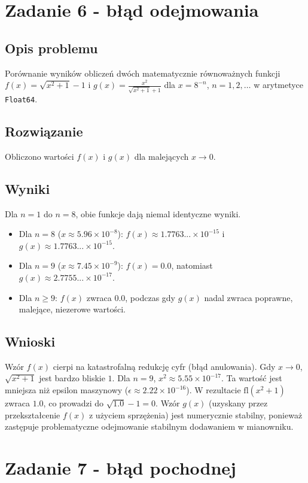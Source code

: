 \documentclass{article}
\begin{document}
\section{Zadanie 6 - błąd odejmowania}
\subsection{Opis problemu}
Porównanie wyników obliczeń dwóch matematycznie równoważnych funkcji $f(x)=\sqrt{x^{2}+1}-1$ i $g(x) = \frac{x^2}{\sqrt{x^{2}+1}+1}$ dla $x=8^{-n}$, $n=1, 2, \dots$ w arytmetyce \texttt{Float64}.

\subsection{Rozwiązanie}
Obliczono wartości $f(x)$ i $g(x)$ dla malejących $x \rightarrow 0$.

\subsection{Wyniki}
Dla $n=1$ do $n=8$, obie funkcje dają niemal identyczne wyniki.
\begin{itemize}
    \item Dla $n=8$ ($x \approx 5.96 \times 10^{-8}$): $f(x) \approx 1.7763... \times 10^{-15}$ i $g(x) \approx 1.7763... \times 10^{-15}$.
    \item Dla $n=9$ ($x \approx 7.45 \times 10^{-9}$): $f(x) = 0.0$, natomiast $g(x) \approx 2.7755... \times 10^{-17}$.
    \item Dla $n \ge 9$: $f(x)$ zwraca $0.0$, podczas gdy $g(x)$ nadal zwraca poprawne, malejące, niezerowe wartości.
\end{itemize}

\subsection{Wnioski}
Wzór $f(x)$ cierpi na katastrofalną redukcję cyfr (błąd anulowania). Gdy $x \rightarrow 0$, $\sqrt{x^2+1}$ jest bardzo bliskie $1$. Dla $n=9$, $x^2 \approx 5.55 \times 10^{-17}$. Ta wartość jest mniejsza niż epsilon maszynowy ($\epsilon \approx 2.22 \times 10^{-16}$). W rezultacie $\text{fl}(x^2+1)$ zwraca $1.0$, co prowadzi do $\sqrt{1.0}-1 = 0$.
Wzór $g(x)$ (uzyskany przez przekształcenie $f(x)$ z użyciem sprzężenia) jest numerycznie stabilny, ponieważ zastępuje problematyczne odejmowanie stabilnym dodawaniem w mianowniku.

\section{Zadanie 7 - błąd pochodnej}
\end{document}
